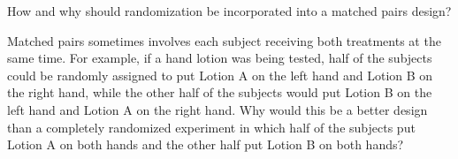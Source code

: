 \begin{exercisewrap}
\begin{nexercise}
How and why should randomization be incorporated into a matched pairs design?\footnotemark
\end{nexercise}
\end{exercisewrap}


\begin{exercisewrap}
\begin{nexercise}
Matched pairs sometimes involves each subject receiving both treatments at the same time. For example, if a hand lotion was being tested, half of the subjects could be randomly assigned to put Lotion A on the left hand and Lotion B on the right hand, while the other half of the subjects would put Lotion B on the left hand and Lotion A on the right hand. Why would this be a better design than a completely randomized experiment in which half of the subjects put Lotion A on both hands and the other half put Lotion B on both hands?\footnotemark\end{nexercise}
\end{exercisewrap}

